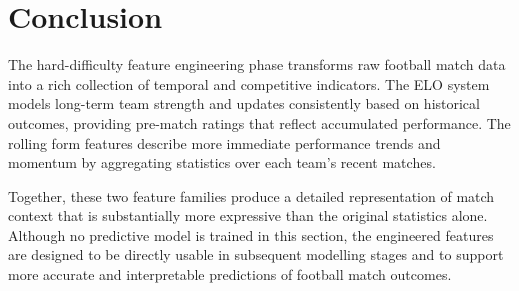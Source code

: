 \documentclass[11pt,a4paper]{article}
\begin{document}
\section{Conclusion}

The hard-difficulty feature engineering phase transforms raw football match data into a rich collection of temporal and competitive indicators. The ELO system models long-term team strength and updates consistently based on historical outcomes, providing pre-match ratings that reflect accumulated performance. The rolling form features describe more immediate performance trends and momentum by aggregating statistics over each team’s recent matches.

Together, these two feature families produce a detailed representation of match context that is substantially more expressive than the original statistics alone. Although no predictive model is trained in this section, the engineered features are designed to be directly usable in subsequent modelling stages and to support more accurate and interpretable predictions of football match outcomes.
\end{document}
